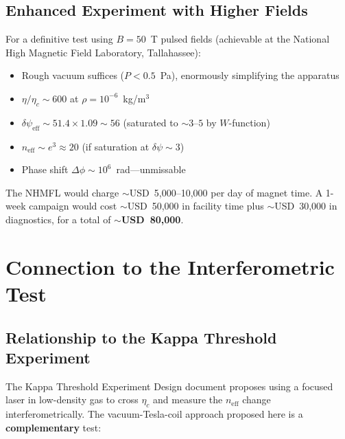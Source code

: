 \documentclass[11pt,a4paper]{article}
\begin{document}
\subsection{Enhanced Experiment with Higher Fields}

For a definitive test using $B = 50$~T pulsed fields (achievable at the National
High Magnetic Field Laboratory, Tallahassee):
\begin{itemize}
\item Rough vacuum suffices ($P < 0.5$~Pa), enormously simplifying the apparatus
\item $\eta/\eta_c \sim 600$ at $\rho = 10^{-6}$~kg/m$^3$
\item $\delta\psi_{\mathrm{eff}} \sim 51.4 \times 1.09 \sim 56$ (saturated to $\sim 3$--$5$ by $W$-function)
\item $n_{\mathrm{eff}} \sim e^3 \approx 20$ (if saturation at $\delta\psi \sim 3$)
\item Phase shift $\Delta\phi \sim 10^6$~rad---unmissable
\end{itemize}

The NHMFL would charge $\sim$USD~5,000--10,000 per day of magnet time.
A 1-week campaign would cost $\sim$USD~50,000 in facility time plus
$\sim$USD~30,000 in diagnostics, for a total of $\sim$\textbf{USD~80,000}.

\section{Connection to the Interferometric Test}\label{sec:interferometric}

\subsection{Relationship to the Kappa Threshold Experiment}

The Kappa Threshold Experiment Design document proposes using a focused laser
in low-density gas to cross $\eta_c$ and measure the $n_{\mathrm{eff}}$ change
interferometrically. The vacuum-Tesla-coil approach proposed here is a
\textbf{complementary} test:
\end{document}
